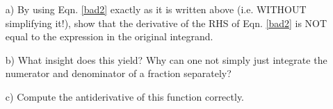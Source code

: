 \documentclass[a4paper,12pt]{article}
\begin{document}
\begin{enumerate}
\begin{itemize}
\item[a)] By using Eqn. \ref{bad2} exactly as it is written above (i.e. WITHOUT simplifying it!), show that the derivative of the RHS of Eqn. \ref{bad2} is NOT equal to the expression in the original integrand.
\item[b)] What insight does this yield?  Why can one not simply just integrate the numerator and denominator of a fraction separately?
\item[c)] Compute the antiderivative of this function correctly.
\end{itemize}
\end{enumerate}
\end{document}
